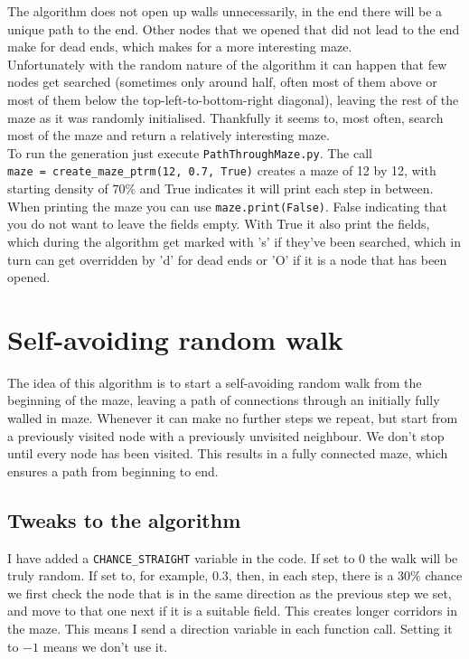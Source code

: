 \documentclass[10pt, a4paper, twoside]{amsart}
\newcommand{\1}{\mathbbm{1}}
\begin{document}
The algorithm does not open up walls unnecessarily, in the end there will be a unique path to the end. Other nodes that we opened that did not lead to the end make for dead ends, which makes for a more interesting maze.\\

Unfortunately with the random nature of the algorithm it can happen that few nodes get searched (sometimes only around half, often most of them above or most of them below the top-left-to-bottom-right diagonal), 
leaving the rest of the maze as it was randomly initialised. Thankfully it seems to, most often, search most of the maze and return a relatively interesting maze.\\

To run the generation just execute \verb+PathThroughMaze.py+. The call\\ \verb+maze = create_maze_ptrm(12, 0.7, True)+ creates a maze of 12 by 12, with starting density of $70\%$ and True indicates it will print each step in between. When printing the maze you can use \verb+maze.print(False)+. False indicating that you do not want to leave the fields empty. With True it also print the fields, which during the algorithm get marked with 's' if they've been searched, which in turn can get overridden by 'd' for dead ends or 'O' if it is a node that has been opened.


\section{Self-avoiding random walk}
The idea of this algorithm is to start a self-avoiding random walk from the beginning of the maze, leaving a path of connections through an initially fully walled in maze. Whenever it can make no further steps we repeat, but start from a previously visited node with a previously unvisited neighbour. We don't stop until  every node has been visited. This results in a fully connected maze, which ensures a path from beginning to end.

\subsection{Tweaks to the algorithm}
I have added a \verb+CHANCE_STRAIGHT+ variable in the code. If set to $0$ the walk will be truly random. If set to, for example, $0.3$, then, in each step, there is a $30\%$ chance we first check the node that is in the same direction as the previous step we set, and move to that one next if it is a suitable field. This creates longer corridors in the maze. This means I send a direction variable in each function call. Setting it to $-1$ means we don't use it. 
\end{document}
